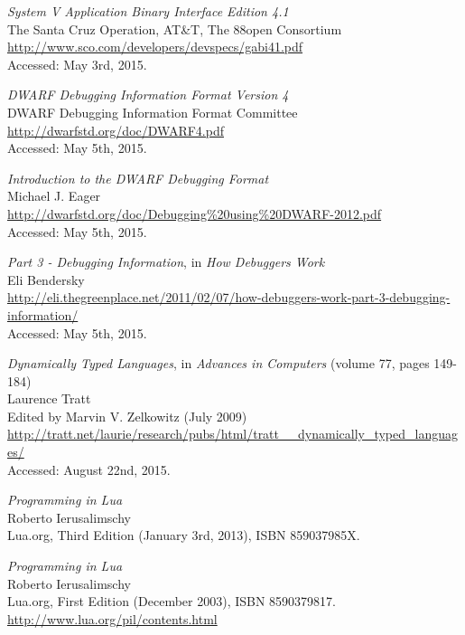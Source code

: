 
\begin{thebibliography}{99}

		\emph{System V Application Binary Interface Edition 4.1} \\
		The Santa Cruz Operation, AT\&T, The 88open Consortium \\
		\url{http://www.sco.com/developers/devspecs/gabi41.pdf} \\
		Accessed: May 3rd, 2015.

		\emph{DWARF Debugging Information Format Version 4} \\
		DWARF Debugging Information Format Committee \\
		\url{http://dwarfstd.org/doc/DWARF4.pdf} \\
		Accessed: May 5th, 2015.

		\emph{Introduction to the DWARF Debugging Format} \\
		Michael J. Eager \\
		\url{http://dwarfstd.org/doc/Debugging\%20using\%20DWARF-2012.pdf} \\
		Accessed: May 5th, 2015.

		\emph{Part 3 -  Debugging Information}, in \emph{How Debuggers Work} \\
		Eli Bendersky \\
		\url{http://eli.thegreenplace.net/2011/02/07/how-debuggers-work-part-3-debugging-information/} \\
		Accessed: May 5th, 2015.

		\emph{Dynamically Typed Languages},
		in \emph{Advances in Computers} (volume 77, pages 149-184) \\
		Laurence Tratt \\
		Edited by Marvin V. Zelkowitz (July 2009) \\
		\url{http://tratt.net/laurie/research/pubs/html/tratt__dynamically_typed_languages/} \\
		Accessed: August 22nd, 2015.

		\emph{Programming in Lua} \\
		Roberto Ierusalimschy \\
		Lua.org, Third Edition (January 3rd, 2013), ISBN 859037985X.

		\emph{Programming in Lua} \\
		Roberto Ierusalimschy \\
		Lua.org, First Edition (December 2003), ISBN 8590379817. \\
		\url{http://www.lua.org/pil/contents.html}


\end{thebibliography}
